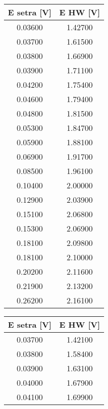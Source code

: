 \begin{table}[H]
    \centering
    \begin{tabular}{|c|c|}
    \hline
    E setra {[}V{]} & E HW {[}V{]} \\ \hline
    0.03600         & 1.42700      \\ \hline
    0.03700         & 1.61500      \\ \hline
    0.03800         & 1.66900      \\ \hline
    0.03900         & 1.71100      \\ \hline
    0.04200         & 1.75400      \\ \hline
    0.04600         & 1.79400      \\ \hline
    0.04800         & 1.81500      \\ \hline
    0.05300         & 1.84700      \\ \hline
    0.05900         & 1.88100      \\ \hline
    0.06900         & 1.91700      \\ \hline
    0.08500         & 1.96100      \\ \hline
    0.10400         & 2.00000      \\ \hline
    0.12900         & 2.03900      \\ \hline
    0.15100         & 2.06800      \\ \hline
    0.15300         & 2.06900      \\ \hline
    0.18100         & 2.09800      \\ \hline
    0.18100         & 2.10000      \\ \hline
    0.20200         & 2.11600      \\ \hline
    0.21900         & 2.13200      \\ \hline
    0.26200         & 2.16100      \\ \hline
    \end{tabular}
    \hspace{1cm}
    \centering
    \begin{tabular}{|c|c|}
    \hline
    E setra {[}V{]} & E HW {[}V{]} \\ \hline
    0.03700         & 1.42100      \\ \hline
    0.03800         & 1.58400      \\ \hline
    0.03900         & 1.63100      \\ \hline
    0.04000         & 1.67900      \\ \hline
    0.04100         & 1.69900      \\ \hline

\end{tabular}
\end{table}
